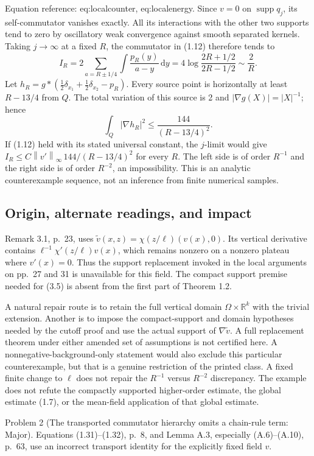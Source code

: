 \documentclass[10pt]{article}
\begin{document}
Equation reference: eq:localcounter, eq:localenergy. Since \(v=0\) on \(\operatorname{supp}q_j\), its self-commutator vanishes exactly. All its interactions with the other two supports tend to zero by oscillatory weak convergence against smooth separated kernels. Taking \(j\to\infty\) at a fixed \(R\), the commutator in (1.12) therefore tends to \[
 I_R=2\sum_{a=R\pm1/4}\int\frac{p_R(y)}{a-y}\,\mathrm dy
     =4\log\frac{2R+1/2}{2R-1/2}\sim\frac2R .\] Let \(h_R=g*(\tfrac12\delta_{x_1}+\tfrac12\delta_{x_2}-p_R)\). Every source point is horizontally at least \(R-13/4\) from \(Q\). The total variation of this source is 2 and \(|\nabla g(X)|=|X|^{-1}\); hence \[
 \int_Q|\nabla h_R|^2\leq\frac{144}{(R-13/4)^2}.\] If (1.12) held with its stated universal constant, the \(j\)-limit would give \(I_R\leq C\left\lVert v'\right\rVert_\infty\,144/(R-13/4)^2\) for every \(R\). The left side is of order \(R^{-1}\) and the right side is of order \(R^{-2}\), an impossibility. This is an analytic counterexample sequence, not an inference from finite numerical samples.\par
\subsection*{Origin, alternate readings, and impact}
Remark 3.1, p. 23, uses \(\widetilde v(x,z)=\chi(z/\ell)(v(x),0)\). Its vertical derivative contains \(\ell^{-1}\chi'(z/\ell)v(x)\), which remains nonzero on a nonzero plateau where \(v'(x)=0\). Thus the support replacement invoked in the local arguments on pp. 27 and 31 is unavailable for this field. The compact support premise needed for (3.5) is absent from the first part of Theorem 1.2.\par
A natural repair route is to retain the full vertical domain \(\Omega\times\mathbb R^k\) with the trivial extension. Another is to impose the compact-support and domain hypotheses needed by the cutoff proof and use the actual support of \(\nabla\widetilde v\). A full replacement theorem under either amended set of assumptions is not certified here. A nonnegative-background-only statement would also exclude this particular counterexample, but that is a genuine restriction of the printed class. A fixed finite change to \(\ell\) does not repair the \(R^{-1}\) versus \(R^{-2}\) discrepancy. The example does not refute the compactly supported higher-order estimate, the global estimate (1.7), or the mean-field application of that global estimate.\par
Problem 2 (The transported commutator hierarchy omits a chain-rule term: Major).  Equations (1.31)–(1.32), p. 8, and Lemma A.3, especially (A.6)–(A.10), p. 63, use an incorrect transport identity for the explicitly fixed field \(v\).\par
\end{document}
